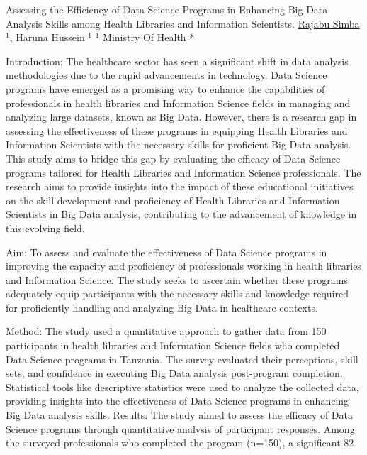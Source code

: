 
    \begin{abstract_online}{Assessing the Efficiency of Data Science Programs in Enhancing Big Data Analysis Skills among Health Libraries and Information Scientists.}{%
    \underline{Rajabu Simba}$^{1}$, Haruna Hussein $^{1}$}{%
    }{%
    $^1$ Ministry Of Health *\newline{}
    }

Introduction: The healthcare sector has seen a significant shift in data analysis methodologies due to the rapid advancements in technology. Data Science programs have emerged as a promising way to enhance the capabilities of professionals in health libraries and Information Science fields in managing and analyzing large datasets, known as Big Data. However, there is a research gap in assessing the effectiveness of these programs in equipping Health Libraries and Information Scientists with the necessary skills for proficient Big Data analysis. This study aims to bridge this gap by evaluating the efficacy of Data Science programs tailored for Health Libraries and Information Science professionals. The research aims to provide insights into the impact of these educational initiatives on the skill development and proficiency of Health Libraries and Information Scientists in Big Data analysis, contributing to the advancement of knowledge in this evolving field.

Aim: To assess and evaluate the effectiveness of Data Science programs in improving the capacity and proficiency of professionals working in health libraries and Information Science. The study seeks to ascertain whether these programs adequately equip participants with the necessary skills and knowledge required for proficiently handling and analyzing Big Data in healthcare contexts.

Method: The study used a quantitative approach to gather data from 150 participants in health libraries and Information Science fields who completed Data Science programs in Tanzania. The survey evaluated their perceptions, skill sets, and confidence in executing Big Data analysis post-program completion. Statistical tools like descriptive statistics were used to analyze the collected data, providing insights into the effectiveness of Data Science programs in enhancing Big Data analysis skills. Results: The study aimed to assess the efficacy of Data Science programs through quantitative analysis of participant responses. Among the surveyed professionals who completed the program (n=150), a significant 82%


\end{abstract_online}
